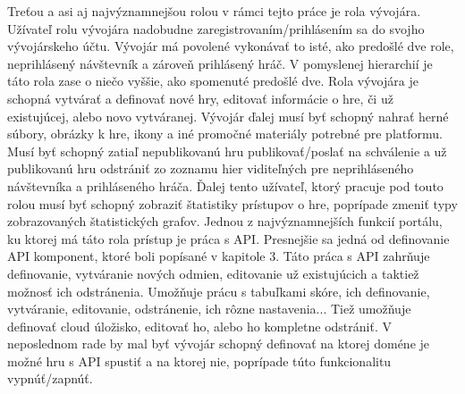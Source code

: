 Treťou a asi aj najvýznamnejšou rolou v rámci tejto práce je rola vývojára. Užívateľ rolu vývojára nadobudne zaregistrovaním/prihlásením sa do svojho vývojárskeho účtu. Vývojár má povolené vykonávať to isté, ako predošlé dve role, neprihlásený návštevník a zároveň prihlásený hráč. V pomyslenej hierarchií je táto rola zase o niečo vyššie, ako spomenuté predošlé dve. Rola vývojára je schopná vytvárať a definovať nové hry, editovať informácie o hre, či už existujúcej, alebo novo vytváranej. Vývojár ďalej musí byť schopný nahrať herné súbory, obrázky k hre, ikony a iné promočné materiály potrebné pre platformu. Musí byť schopný zatiaľ nepublikovanú hru publikovať/poslať na schválenie a už publikovanú hru odstrániť zo zoznamu hier viditeľných pre neprihláseného návštevníka a prihláseného hráča. Ďalej tento užívateľ, ktorý pracuje pod touto rolou musí byť schopný zobraziť štatistiky prístupov o hre, poprípade zmeniť typy zobrazovaných štatistických grafov. Jednou z najvýznamnejších funkcií portálu, ku ktorej má táto rola prístup je práca s API. Presnejšie sa jedná od definovanie API komponent, ktoré boli popísané v kapitole 3. Táto práca s API zahrňuje definovanie, vytváranie nových odmien, editovanie už existujúcich a taktiež možnosť ich odstránenia. Umožňuje prácu s tabuľkami skóre, ich definovanie, vytváranie, editovanie, odstránenie, ich rôzne nastavenia... Tiež umožňuje definovať cloud úložisko, editovať ho, alebo ho kompletne odstrániť. V neposlednom rade by mal byť vývojár schopný definovať na ktorej doméne je možné hru s API spustiť a na ktorej nie, poprípade túto funkcionalitu vypnúť/zapnúť. 
